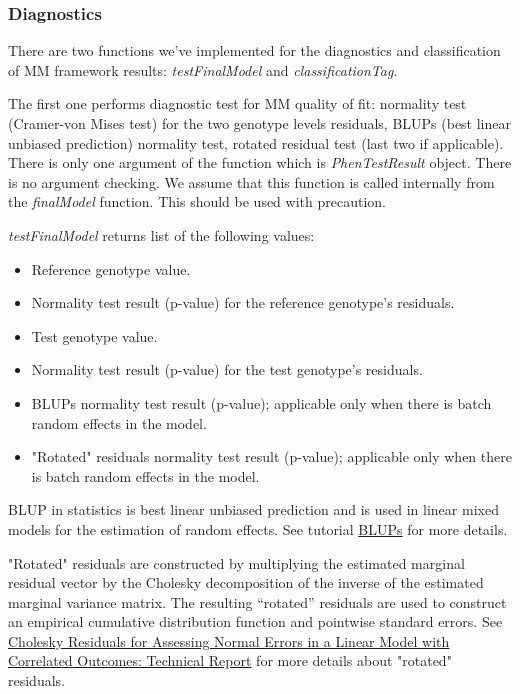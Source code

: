 \documentclass[12pt,a4paper]{article}
\begin{document}
\subsubsection{Diagnostics}
There are two functions we've implemented for the diagnostics and classification of MM framework results: \textit{testFinalModel} and \textit{classificationTag}.

The first one performs diagnostic test for MM quality of fit: normality test (Cramer-von Mises test) for the two genotype levels residuals, BLUPs (best linear unbiased prediction) normality test, rotated residual test (last two if applicable). There is only one argument of the function which is \textit{PhenTestResult} object. There is no argument checking. We assume that this function is called internally from the \textit{finalModel} function. This should be used with precaution. 

 \textit{testFinalModel} returns list of the following values:
 \begin{itemize}
  \item Reference genotype value.
  \item Normality test result (p-value) for the reference genotype's residuals.
  \item Test genotype value.
  \item Normality test result (p-value) for the test genotype's residuals.
  \item BLUPs normality test result (p-value); applicable only when there is batch random effects in the model.
  \item "Rotated" residuals normality test result (p-value); applicable only when there is batch random effects in the model.
 \end{itemize}

BLUP in statistics is best linear unbiased prediction and is used in linear mixed models for the estimation of random effects. See tutorial \href{http://www.extension.org/pages/61006/the-solcap-tomato-phenotypic-data:-estimating-heritability-and-blups-for-traits#.Ui4zjWRgYXc}{BLUPs} for more details.

"Rotated" residuals are constructed by multiplying the estimated marginal residual vector by
the Cholesky decomposition of the inverse of the estimated marginal variance
matrix. The resulting “rotated” residuals are used to construct an empirical cumulative distribution function and pointwise standard errors. See
\href{http://biostats.bepress.com/cgi/viewcontent.cgi?article=1019&context=harvardbiostat}{Cholesky Residuals for Assessing Normal
Errors in a Linear Model with Correlated
Outcomes: Technical Report} for more details about "rotated" residuals.
\end{document}
